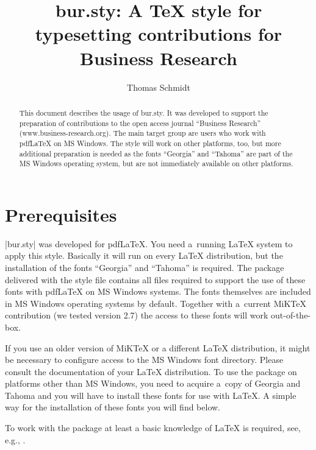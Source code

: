 \documentclass{article}
\begin{document}
\title{bur.sty: A TeX style for typesetting contributions for Business Research}


\author{Thomas Schmidt
  }

\begin{abstract}
  This document describes the usage of bur.sty. It was developed to support
  the preparation of contributions to the open access journal ``Business
  Research'' (www.business-research.org). The main target group are users who
  work with {pdf\LaTeX} on MS Windows. The style will work on other platforms,
  too, but more additional preparation is needed as the fonts ``Georgia'' and
  ``Tahoma'' are part of the MS Windows operating system, but are not
  immediately available on other platforms.

\end{abstract}


\maketitle


\section*{Prerequisites}

  |bur.sty| was developed for {pdf\LaTeX}. You need a~running {\LaTeX} system
  to apply this style. Basically it will run on every {\LaTeX} distribution,
  but the installation of the fonts ``Georgia'' and ``Tahoma'' is
  required. The package delivered with the style file contains all files
  required to support the use of these fonts with {pdf\LaTeX} on MS Windows
  systems. The fonts themselves are included in MS Windows operating systems
  by default. Together with a~current MiKTeX contribution (we tested version
  2.7) the access to these fonts will work out-of-the-box.

  If you use an older version of MiKTeX or a different {\LaTeX} distribution,
  it might be necessary to configure access to the MS Windows font
  directory. Please consult the documentation of your {\LaTeX}
  distribution. To use the package on platforms other than MS Windows, you
  need to acquire a~copy of Georgia and Tahoma and you will have to
  install these fonts for use with {\LaTeX}. A simple way for the installation
  of these fonts you will find below.

   To work with the package at least a basic knowledge of {\LaTeX} is
   required, see, e.g., \cite{mittelbach:2005}.
\end{document}
